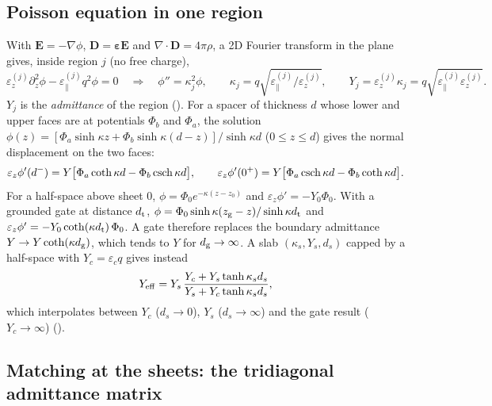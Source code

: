 \subsection{Poisson equation in one region}

With $\bm E=-\nabla\phi$, $\bm D=\bm\varepsilon\bm E$ and $\nabla\cdot\bm D=4\pi\rho$, a 2D Fourier transform
in the plane gives, inside region $j$ (no free charge),
\begin{equation}
\varepsilon_z^{(j)}\partial_z^2\phi-\varepsilon_\parallel^{(j)}q^2\phi=0
\quad\Rightarrow\quad
\phi''=\kappa_j^2\phi,\qquad
\kappa_j=q\sqrt{\varepsilon_\parallel^{(j)}/\varepsilon_z^{(j)}},\qquad
Y_j=\varepsilon_z^{(j)}\kappa_j=q\sqrt{\varepsilon_\parallel^{(j)}\varepsilon_z^{(j)}} .
\label{eq:kappaY}
\end{equation}
$Y_j$ is the \emph{admittance} of the region (). For a spacer of thickness $d$
whose lower and upper faces are at potentials $\Phi_b$ and $\Phi_a$, the solution
$\phi(z)=[\Phi_a\sinh\kappa z+\Phi_b\sinh\kappa(d-z)]/\sinh\kappa d$ ($0\le z\le d$) gives the normal
displacement on the two faces:
\begin{equation}
\varepsilon_z\phi'(d^-)=Y\bigl[\Phi_a\coth\kappa d-\Phi_b\operatorname{csch}\kappa d\bigr],\qquad
\varepsilon_z\phi'(0^+)=Y\bigl[\Phi_a\operatorname{csch}\kappa d-\Phi_b\coth\kappa d\bigr].
\label{eq:spacer}
\end{equation}
For a half-space above sheet $0$, $\phi=\Phi_0e^{-\kappa(z-z_0)}$ and $\varepsilon_z\phi'=-Y_0\Phi_0$. With a
grounded gate at distance $d_{\rm t}$, $\phi=\Phi_0\sinh\kappa(z_{\rm g}-z)/\sinh\kappa d_{\rm t}$ and
$\varepsilon_z\phi'=-Y_0\coth(\kappa d_{\rm t})\,\Phi_0$. A gate therefore replaces the boundary admittance
$Y\to Y\coth(\kappa d_{\rm g})$, which tends to $Y$ for $d_{\rm g}\to\infty$. A slab
$(\kappa_s,Y_s,d_s)$ capped by a half-space with $Y_c=\varepsilon_cq$ gives instead
\begin{equation}
Y_{\rm eff}=Y_s\,\frac{Y_c+Y_s\tanh\kappa_sd_s}{Y_s+Y_c\tanh\kappa_sd_s},
\label{eq:capped}
\end{equation}
which interpolates between $Y_c$ ($d_s\to0$), $Y_s$ ($d_s\to\infty$) and the gate result ($Y_c\to\infty$)
().

\subsection{Matching at the sheets: the tridiagonal admittance matrix}

